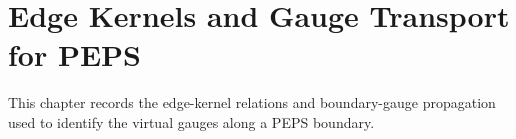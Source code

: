 
\chapter{Edge Kernels and Gauge Transport for PEPS}%
\label{ch:peps_edge_kernel_gauges}

This chapter records the edge-kernel relations and boundary-gauge propagation
used to identify the virtual gauges along a PEPS boundary.


